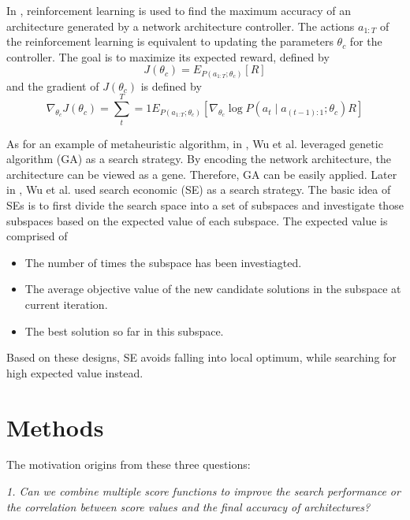 \documentclass[sigconf]{acmart}
\begin{document}
    In \cite{zoph2017neural}, reinforcement learning is used to find the maximum accuracy of an architecture 
    generated by a network architecture controller. The actions $a_{1:T}$ of the reinforcement learning is 
    equivalent to updating the parameters $\theta_c$ for the controller. The goal is to maximize 
    its expected reward, defined by 
    \begin{equation}
        \label{equ:reinforcement_rw}
        J(\theta_c)=E_{P(a_{1:T};\theta_c)}[R]
    \end{equation}
    and the gradient of $J(\theta_c)$ is defined by
    \begin{equation}
        \label{equ:reinforcement_grad}
        \nabla_{\theta_c} J(\theta_c)=\sum^T_t=1 E_{P(a_{1:T};\theta_c)}[\nabla_{\theta_c}\log P(a_t\mid a_{(t-1):1};\theta_c)R]
    \end{equation}

    As for an example of metaheuristic algorithm, in \cite{10.1145/3491396.3506510}, Wu et al. leveraged 
    genetic algorithm (GA) as a search strategy. 
    By encoding the network architecture, the architecture can be viewed as a gene. Therefore, GA can be 
    easily applied. 
    Later in \cite{10092788}, Wu et al. used search economic (SE) \cite{7379579} as a search strategy. The 
    basic idea of SEs is to first divide the search space into a set of subspaces and investigate those 
    subspaces based on the expected value of each subspace. The expected value is comprised of 
    \begin{itemize}
        \item The number of times the subspace has been investiagted. 
        \item The average objective value of the new candidate solutions in the subspace at current iteration. 
        \item The best solution so far in this subspace. 
    \end{itemize}
    Based on these designs, SE avoids falling into local optimum, while searching for high expected value instead. 
    
    \section{Methods}
    \label{sec:proposed}

    The motivation origins from these three questions: 

    \textit{1. Can we combine multiple score functions to improve the search performance 
    or the correlation between score values and the final accuracy of architectures?}
    
\end{document}
